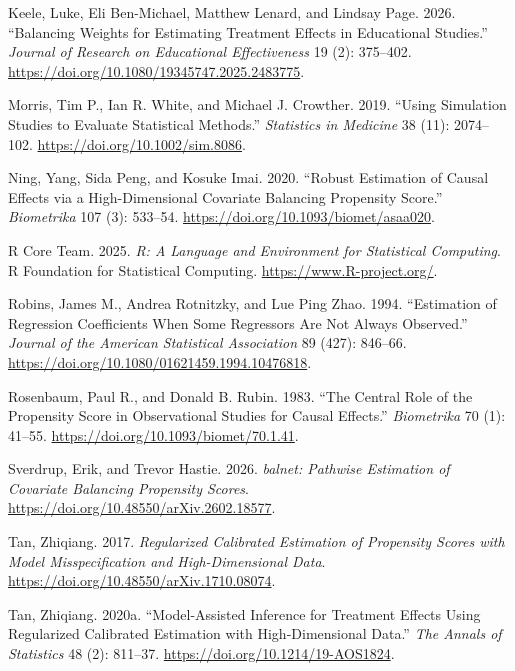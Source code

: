 \documentclass[
  12pt,
  a4paper,
]{article}
\newlength{\cslhangindent}
\newenvironment{CSLReferences}[2] %
 {\begin{list}{}{%
  \setlength{\itemindent}{0pt}
  \setlength{\leftmargin}{0pt}
  \setlength{\parsep}{0pt}
  \ifodd #1
   \setlength{\leftmargin}{\cslhangindent}
   \setlength{\itemindent}{-1\cslhangindent}
  \fi
  \setlength{\itemsep}{#2\baselineskip}}}
 {\end{list}}
\begin{document}
\begin{CSLReferences}{1}{1}
Keele, Luke, Eli Ben-Michael, Matthew Lenard, and Lindsay Page. 2026.
{``Balancing Weights for Estimating Treatment Effects in Educational
Studies.''} \emph{Journal of Research on Educational Effectiveness} 19
(2): 375--402. \url{https://doi.org/10.1080/19345747.2025.2483775}.

Morris, Tim P., Ian R. White, and Michael J. Crowther. 2019. {``Using
Simulation Studies to Evaluate Statistical Methods.''} \emph{Statistics
in Medicine} 38 (11): 2074--102. \url{https://doi.org/10.1002/sim.8086}.

Ning, Yang, Sida Peng, and Kosuke Imai. 2020. {``Robust Estimation of
Causal Effects via a High-Dimensional Covariate Balancing Propensity
Score.''} \emph{Biometrika} 107 (3): 533--54.
\url{https://doi.org/10.1093/biomet/asaa020}.

R Core Team. 2025. \emph{R: A Language and Environment for Statistical
Computing}. R Foundation for Statistical Computing.
\url{https://www.R-project.org/}.

Robins, James M., Andrea Rotnitzky, and Lue Ping Zhao. 1994.
{``Estimation of Regression Coefficients When Some Regressors Are Not
Always Observed.''} \emph{Journal of the American Statistical
Association} 89 (427): 846--66.
\url{https://doi.org/10.1080/01621459.1994.10476818}.

Rosenbaum, Paul R., and Donald B. Rubin. 1983. {``The Central Role of
the Propensity Score in Observational Studies for Causal Effects.''}
\emph{Biometrika} 70 (1): 41--55.
\url{https://doi.org/10.1093/biomet/70.1.41}.

Sverdrup, Erik, and Trevor Hastie. 2026. \emph{{balnet}: Pathwise
Estimation of Covariate Balancing Propensity Scores}.
\url{https://doi.org/10.48550/arXiv.2602.18577}.

Tan, Zhiqiang. 2017. \emph{Regularized Calibrated Estimation of
Propensity Scores with Model Misspecification and High-Dimensional
Data}. \url{https://doi.org/10.48550/arXiv.1710.08074}.

Tan, Zhiqiang. 2020a. {``Model-Assisted Inference for Treatment Effects
Using Regularized Calibrated Estimation with High-Dimensional Data.''}
\emph{The Annals of Statistics} 48 (2): 811--37.
\url{https://doi.org/10.1214/19-AOS1824}.


\end{CSLReferences}
\end{document}
